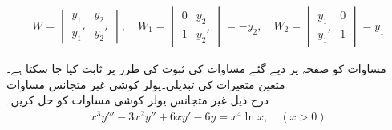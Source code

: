 \begin{align*}
W=
\begin{vmatrix}
y_1& y_2\\[1mm]
y_1'&y_2'
\end{vmatrix}, \quad
W_1=
\begin{vmatrix}
0&y_2\\[1mm]
1&y_2'
\end{vmatrix}=-y_2, \quad
W_2=
\begin{vmatrix}
y_1& 0\\[1mm]
y_1'&1
\end{vmatrix}=y_1
\end{align*}

مساوات  کو صفحہ  پر دیے  گئے 
 مساوات  کی ثبوت کی طرز پر ثابت کیا جا سکتا ہے۔
متعین متغیرات کی تبدیلی۔یولر کوشی غیر متجانس مساوات\\
درج ذیل غیر متجانس یولر کوشی مساوات کو حل کریں۔
\begin{align*}
x^3y'''-3x^2y''+6xy'-6y=x^4\ln x , \quad (x>0) 
\end{align*}

